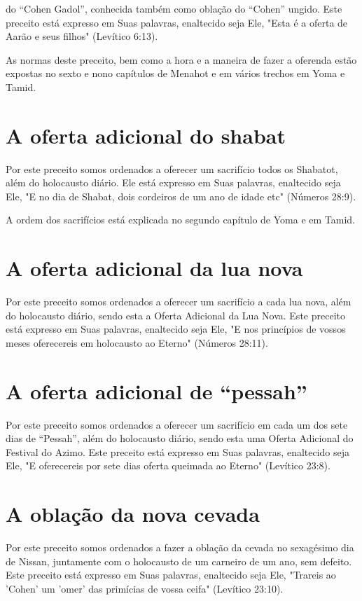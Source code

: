 do ``Cohen Gadol'', conhecida também como oblação do ``Cohen'' ungido. Este
preceito está expresso em Suas palavras, enaltecido seja Ele, "Esta é a
oferta de Aarão e seus filhos" (Levítico 6:13).

As normas deste preceito, bem como a hora e a maneira de fazer a
oferenda estão expostas no sexto e nono capítulos de Menahot e em vários
tre­chos em Yoma e Tamid.

\section{A oferta adicional do shabat}

Por este preceito somos ordenados a oferecer um sacrifício todos os
Shabatot, além do holocausto diário. Ele está expresso em Suas palavras,
enal­tecido seja Ele, "E no dia de Shabat, dois cordeiros de um ano de
idade etc" (Números 28:9).

A ordem dos sacrifícios está explicada no segundo capítulo de Yo­ma e em
Tamid.

\section{A oferta adicional da lua nova}

Por este preceito somos ordenados a oferecer um sacrifício a cada lua
nova, além do holocausto diário, sendo esta a Oferta Adicional da Lua
No­va. Este preceito está expresso em Suas palavras, enaltecido seja
Ele, "E nos princípios de vossos meses oferecereis em holocausto ao
Eterno" (Números 28:11).


\section{A oferta adicional de ``pessah''}


Por este preceito somos ordenados a oferecer um sacrifício em cada um
dos sete dias de ``Pessah'', além do holocausto diário, sendo esta uma
Ofer­ta Adicional do Festival do Azimo. Este preceito está expresso em
Suas pala­vras, enaltecido seja Ele, "E oferecereis por sete dias oferta
queimada ao Eter­no" (Levítico 23:8).

\section{A oblação da nova cevada}

Por este preceito somos ordenados a fazer a oblação da cevada no
sexagésimo dia de Nissan, juntamente com o holocausto de um carneiro de
um ano, sem defeito. Este preceito está expresso em Suas palavras,
enaltecido seja Ele, "Trareis ao 'Cohen' um 'omer' das primícias de
vossa ceifa" (Levítico 23:10).

